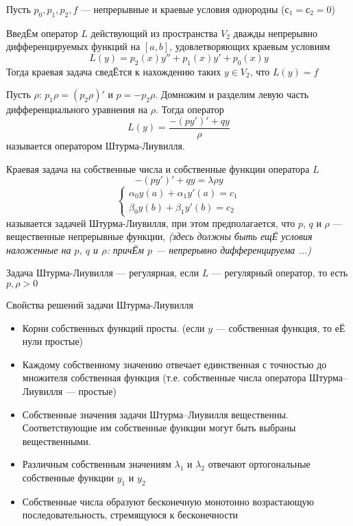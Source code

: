 \documentclass{article}
\begin{document}
Пусть $ p_0, p_1, p_2, f $ --- непрерывные и краевые условия однородны ($ с_1 = с_2 = 0 $)

Введ{\footnotesize Ё}м оператор $ L $ действующий из пространства $V_2$ дважды непрерывно дифференцируемых функций на $ [a, b] $, удовлетворяющих краевым условиям 
\[ L(y) = p_2(x)y'' + p_1(x)y' + p_0(x)y \]
Тогда краевая задача свед{\footnotesize Ё}тся к нахождению таких $ y \in V_2 $, что $ L(y) = f $

Пусть $ \rho $: $ p_1 \rho = (p_2 \rho)'$ и $p = -p_2 \rho$. Домножим и разделим левую часть дифференциального уравнения на $\rho$. Тогда оператор  
\[ L(y) = \frac{-(py')' + qy}{\rho} \]
называется оператором Штурма-Лиувилля. 

Краевая задача на собственные числа и собственные функции оператора $L$
\[ -(py')' + qy = \lambda \rho y \]
\[ \left\{\begin{matrix}
	\alpha_0 y(a) + \alpha_1 y'(a) = c_1\\ 
	\beta_0 y(b) + \beta_1 y'(b) = c_2
\end{matrix}\right. \]
называется задачей Штурма-Лиувилля, при этом предполагается, что $ p $, $ q $ и $ \rho $ --- вещественные непрерывные функции, \textit{(здесь должны быть ещ{\footnotesize Ё} условия наложенные на $ p $, $ q $ и $ \rho $:  прич{\footnotesize Ё}м $ p $ --- непрерывно дифференцируема ...) }

Задача Штурма-Лиувилля --- регулярная, если $L$ --- регулярный оператор, то есть $p, \rho > 0$

Свойства решений задачи Штурма-Лиувилля
\begin{itemize}
	\item
	Корни собственных функций просты. (если $y$ --- собственная функция, то е{\footnotesize Ё} нули простые)
	\item
	Каждому собственному значению отвечает единственная с точностью до множителя собственная функция (т.е. собственные числа оператора Штурма–Лиувилля --- простые)
	\item
	Собственные значения задачи Штурма–Лиувилля вещественны. Соответствующие им собственные функции могут быть выбраны вещественными.
	\item
	Различным собственным значениям $ \lambda_1 $ и $ \lambda_2 $ отвечают ортогональные собственные функции $ y_1 $ и $ y_2 $
	\item
	Собственные числа образуют бесконечную монотонно возрастающую последовательность, стремящуюся к бесконечности
\end{itemize}
\end{document}
